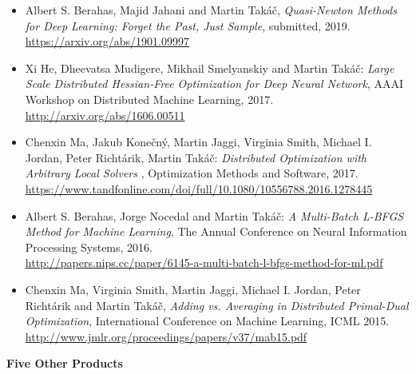 \documentclass[11pt]{article}
\newcommand{\0}{ {\bf 0}}
\begin{document}
\begin{itemize}
\setlength\itemsep{0.1em}

\item Albert S. Berahas, Majid Jahani and  Martin Tak\'a\v{c},
{\it Quasi-Newton Methods for Deep Learning: Forget the Past, Just Sample},
 submitted, 2019.
\\
\url{https://arxiv.org/abs/1901.09997}
 


\item 
Xi He, Dheevatsa Mudigere, Mikhail Smelyanskiy and Martin Tak\'a\v{c}:
{\it Large Scale Distributed Hessian-Free Optimization for Deep Neural Network},
AAAI Workshop on Distributed Machine Learning, 2017.
\url{http://arxiv.org/abs/1606.00511}

\item 
Chenxin Ma, Jakub Konečný, Martin Jaggi, Virginia Smith, Michael I. Jordan, Peter Richtárik, Martin  Tak\'a\v{c}:
{\it Distributed Optimization with Arbitrary Local Solvers
},
Optimization Methods and Software, 2017.
\\
\url{https://www.tandfonline.com/doi/full/10.1080/10556788.2016.1278445}
 

\item 
Albert S. Berahas, Jorge Nocedal and Martin Tak\'a\v{c}:
{\it 
A Multi-Batch L-BFGS Method for Machine Learning},
The Annual Conference on Neural Information Processing Systems, 2016.
\\
\url{http://papers.nips.cc/paper/6145-a-multi-batch-l-bfgs-method-for-ml.pdf}

 
\item
Chenxin Ma,
Virginia Smith,
Martin Jaggi,
Michael I. Jordan,
Peter Richt\'arik and Martin Tak\'a\v{c},
{\it Adding vs. Averaging in Distributed Primal-Dual Optimization},
International Conference on Machine Learning, ICML 2015.
\url{http://www.jmlr.org/proceedings/papers/v37/mab15.pdf}
 
  








\end{itemize}

\noindent 
{\bf\color{color1}Five Other Products\vskip-8pt}
\end{document}
